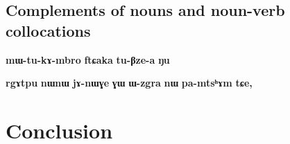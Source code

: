 \documentclass[oneside,a4paper,11pt]{article}
\newcommand{\ipa}[1]{\textbf{\phon#1}} %
\begin{document}
\subsection{Complements of nouns and noun-verb collocations}
\ipa{mɯ-tu-kɤ-mbro} 	\ipa{ftɕaka} 	\ipa{tu-βze-a} 	\ipa{ŋu} 

\ipa{rgɤtpu} 	\ipa{nɯnɯ} 	\ipa{jɤ-nɯɣe} 	\ipa{ɣɯ} 	\ipa{ɯ-zgra} 	\ipa{nɯ} 	\ipa{pa-mtsʰɤm} 	\ipa{tɕe,} 


 \section{Conclusion}
 


\end{document}
